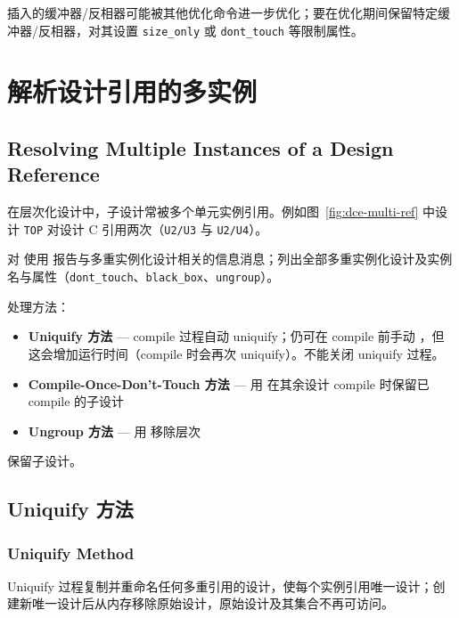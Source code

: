 插入的缓冲器/反相器可能被其他优化命令进一步优化；要在优化期间保留特定缓冲器/反相器，对其设置 \texttt{size\_only} 或 \texttt{dont\_touch} 等限制属性。

\section{解析设计引用的多实例}
\subsection*{Resolving Multiple Instances of a Design Reference}

在层次化设计中，子设计常被多个单元实例引用。例如图~\ref{fig:dce-multi-ref} 中设计 \texttt{TOP} 对设计 C 引用两次（\texttt{U2/U3} 与 \texttt{U2/U4}）。


对  使用  报告与多重实例化设计相关的信息消息；列出全部多重实例化设计及实例名与属性（\texttt{dont\_touch}、\texttt{black\_box}、\texttt{ungroup}）。

处理方法：
\begin{itemize}
  \item \textbf{Uniquify 方法} — compile 过程自动 uniquify；仍可在 compile 前手动 ，但这会增加运行时间（compile 时会再次 uniquify）。不能关闭 uniquify 过程。
  \item \textbf{Compile-Once-Don't-Touch 方法} — 用  在其余设计 compile 时保留已 compile 的子设计
  \item \textbf{Ungroup 方法} — 用  移除层次
\end{itemize}

\begin{seeAlsoBox}
保留子设计。
\end{seeAlsoBox}

\subsection{Uniquify 方法}
\subsubsection*{Uniquify Method}

Uniquify 过程复制并重命名任何多重引用的设计，使每个实例引用唯一设计；创建新唯一设计后从内存移除原始设计，原始设计及其集合不再可访问。

